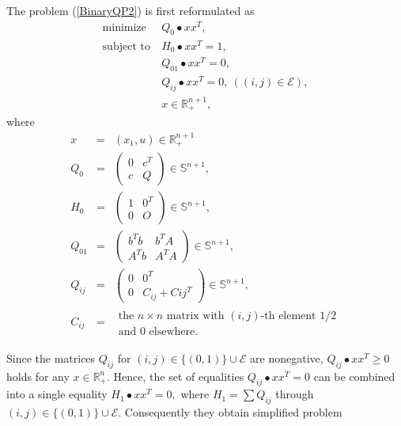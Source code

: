 \documentclass[12pt]{book}
\theoremstyle{definition}
\begin{document}
The problem (\ref{BinaryQP2}) is first reformulated as 
\begin{equation}
\label{BinaryQP2ref}
\begin{array}{ll}
\mbox{minimize}&\  Q_0\bullet xx^T ,\\
\mbox{subject to}&\  H_0\bullet xx^T = 1,\\
				 &\  Q_{01}\bullet xx^T = 0,\\
				 &\ Q_{ij}\bullet xx^T = 0, \ ((i,j)\in \mathcal{E}), \\
				 &\ x\in \mathbb{R}^{n+1}_+, 
\end{array}
\end{equation}
where 
\begin{eqnarray*}
x &=& (x_1,u)\in\mathbb{R}^{n+1}_+ \\
Q_0 &=& \left(\begin{array}{rr} 0 & c^T \\ c & Q\end{array}\right) \in\mathbb{S}^{n+1},\\
H_0 &=& \left(\begin{array}{rr} 1 & 0^T \\ 0 & O\end{array}\right) \in\mathbb{S}^{n+1}, \\
Q_{01} &=& \left(\begin{array}{rr} b^Tb & b^TA \\ A^Tb & A^TA\end{array}\right) \in\mathbb{S}^{n+1},\\
Q_{ij} &=& \left(\begin{array}{cc} 0 & 0^T \\ 0 & C_{ij} + C{ij}^T\end{array}\right) \in\mathbb{S}^{n+1},\\
C_{ij} &=& \begin{array}{l} \mbox{the } n\times n\mbox{ matrix with } (i,j)\mbox{-th element 1/2}\\ \mbox{and 0 elsewhere.} \end{array}
\end{eqnarray*}



Since the matrices $Q_{ij}$ for $(i,j)\in\{(0,1)\}\cup \mathcal{E}$ are nonegative, $Q_{ij}\bullet xx^T\geq 0 $ holds for any $x\in \mathbb{R}^n_+$. Hence, the set of equalities $Q_{ij}\bullet xx^T = 0$ can be combined into a single equality $H_1\bullet xx^T = 0, $ where $H_1 = \sum Q_{ij}$ through $(i,j)\in\{(0,1)\}\cup \mathcal{E}.$
Consequently they obtain simplified problem
\end{document}
